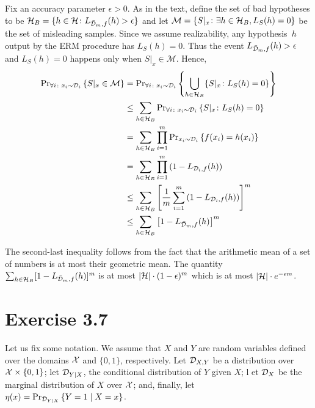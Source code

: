Fix an accuracy parameter $\epsilon > 0$. As in the text, define the set of bad
hypotheses to be $\mathcal{H}_{B} = \{h \in \mathcal{H} \colon L_{\bar{\mathcal{D}}_m, f}
(h) > \epsilon\}$ and let $\mathcal{M} = \{S \vert_x \colon \exists h \in
\mathcal{H}_{B}, L_S(h) = 0\}$ be the set of misleading samples. Since we assume
realizability, any hypothesis~$h$ output by the ERM procedure has $L_S(h) =
0$. Thus the event $L_{\bar{\mathcal{D}}_m, f} (h) > \epsilon$ and $L_S(h) = 0$
happens only when $S \vert_x \in \mathcal{M}$. Hence,
\begin{align*}
	\text{Pr}_{\forall i \colon x_i \sim \mathcal{D}_i} \left \{ S \vert_x \in \mathcal{M} \right \} 
	& = \text{Pr}_{\forall i \colon x_i \sim \mathcal{D}_i} \left \{ \bigcup_{h \in \mathcal{H}_{B}} 
			   \{S \vert_x \colon L_S(h) = 0\} \right \} \\
    & \leq \sum_{h \in \mathcal{H}_B} 
    		\text{Pr}_{\forall i \colon x_i \sim \mathcal{D}_i} \left \{ S \vert_x \colon L_S(h) = 0 \right \} \\
    & = \sum_{h \in \mathcal{H}_B}  
    		\prod_{i = 1}^{m} \text{Pr}_{x_i \sim \mathcal{D}_i} \left \{ f(x_i) = h(x_i) \right \} \\
    & =  \sum_{h \in \mathcal{H}_B}  
    		\prod_{i = 1}^{m} \left ( 1 - L_{\mathcal{D}_i, f} (h) \right ) \\
    & \leq \sum_{h \in \mathcal{H}_B} \left [ 
            \frac{1}{m} \sum_{i = 1}^{m} \left ( 1 - L_{\mathcal{D}_i, f} (h) \right )
        \right ]^m \\
    & \leq \sum_{h \in \mathcal{H}_B} \left [ 1 - L_{\bar{\mathcal{D}}_{m}, f} (h)\right ]^m 
\end{align*}

The second-last inequality follows from the fact that the arithmetic mean of a set of numbers 
is at most their geometric mean. The quantity 
$\sum_{h \in \mathcal{H}_B} [ 1 - L_{\bar{\mathcal{D}}_{m}, f} (h)]^m$ 
is at most $| \mathcal{H} | \cdot (1 - \epsilon)^m $ which is at most 
$| \mathcal{H} | \cdot e^{- \epsilon m}$.

\section*{Exercise 3.7} Let us fix some notation. We assume that $X$ and $Y$ are 
random variables defined over the domains $\mathcal{X}$ and $\{0, 1\}$, respectively. 
Let $\mathcal{D}_{X, Y}$ be a distribution over $\mathcal{X} \times \{0, 1\}$; 
let $\mathcal{D}_{Y \mid X}$, the conditional distribution of $Y$ given $X$; l
et $\mathcal{D}_{X}$ be the marginal distribution of $X$ over $\mathcal{X}$; and, finally, let 
$\eta(x) = \text{Pr}_{\mathcal{D}_{Y \mid X}} \left \{ Y = 1 \mid X = x \right \}$. 

